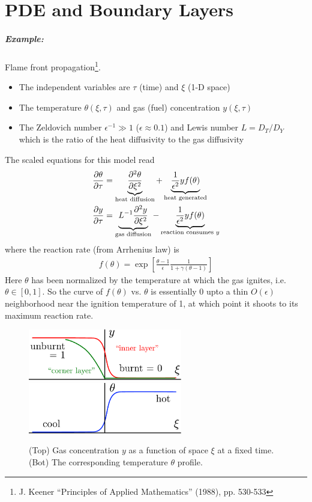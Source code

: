 \chapter[PDE and BL]{PDE and Boundary Layers}
\paragraph{Example:} Flame front propagation\footnote{J. Keener ``Principles of Applied Mathematics'' (1988), pp. 530-533}.
\begin{itemize}
	\item The independent variables are $\tau $ (time) and $\xi$ (1-D space)
	\item The temperature $\theta (\xi,\tau)$ and gas (fuel) concentration $y(\xi,\tau)$
	\item The Zeldovich number $\epsilon^{-1}\gg 1$ ($\epsilon \approx 0.1$) and Lewis number $L=D_T/D_Y$ which is the ratio of the heat diffusivity to the gas diffusivity
\end{itemize}
The scaled equations for this model read
\begin{align*}
	\frac{\partial \theta}{\partial \tau} &= \underbrace{\frac{\partial^2 \theta}{\partial \xi^2}}_\text{heat diffusion} +\underbrace{ \frac{1}{\epsilon^2} y f(\theta)}_\text{heat generated} \\
	\frac{\partial y}{\partial \tau} &= \underbrace{L^{-1} \frac{\partial^2 y}{\partial \xi^2}}_\text{gas diffusion} -  \underbrace{ \frac{1}{\epsilon^2} y f(\theta)}_\text{reaction consumes $y$}
\end{align*} 
where the reaction rate (from Arrhenius law) is
\begin{gather*}
	f(\theta) = \exp \left[\frac{\theta - 1}{\epsilon} \frac{1}{1+ \gamma (\theta-1)}\right]
\end{gather*}
Here $\theta$ has been normalized by the temperature at which the gas ignites, i.e. $\theta \in [0,1]$. So the curve of $f(\theta)$ vs. $\theta$ is essentially 0 upto a thin $O(\epsilon)$ neighborhood near the ignition temperature of 1, at which point it shoots to its maximum reaction rate.
\begin{figure}[!h]
	\centering
	\includegraphics[width=0.6\textwidth]{./plots/pdf/burning-front-gas.pdf}\\ \vspace{5mm}
	\includegraphics[width=0.6\textwidth]{./plots/pdf/burning-front-temp.pdf}
	\caption{(Top) Gas concentration $y$ as a function of space $\xi$ at a fixed time. (Bot) The corresponding temperature $\theta$ profile. }
	\label{fig:wk26}
\end{figure}
